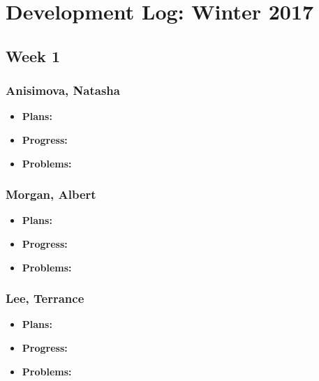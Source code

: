 \documentclass[10pt,draftclsnofoot,onecolumn]{IEEEtran}
\begin{document}
\section{Development Log: Winter 2017}
\subsection{Week 1}
\subsubsection{Anisimova, Natasha}
\begin{itemize}
	\item \textbf{Plans: }
	\item \textbf{Progress: }
	\item \textbf{Problems: }
\end{itemize}
\subsubsection{Morgan, Albert}
\begin{itemize}
	\item \textbf{Plans: }
	\item \textbf{Progress: }
	\item \textbf{Problems: }
\end{itemize}
\subsubsection{Lee, Terrance}
\begin{itemize}
	\item \textbf{Plans: }
	\item \textbf{Progress: }
	\item \textbf{Problems: }
\end{itemize}
\end{document}
